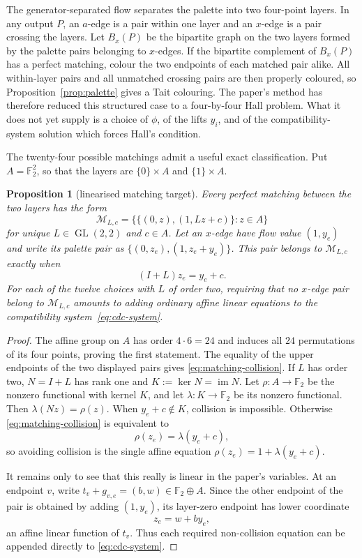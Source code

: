 \documentclass[11pt,a4paper]{article}
\newtheorem{proposition}[theorem]{Proposition}
\theoremstyle{definition}
\theoremstyle{remark}
\begin{document}
The generator-separated flow separates the palette into two four-point layers.  In any output $P$, an $a$-edge is a pair within one layer and an $x$-edge is a pair crossing the layers.  Let $B_x(P)$ be the bipartite graph on the two layers formed by the palette pairs belonging to $x$-edges.  If the bipartite complement of $B_x(P)$ has a perfect matching, colour the two endpoints of each matched pair alike.  All within-layer pairs and all unmatched crossing pairs are then properly coloured, so Proposition~\ref{prop:palette} gives a Tait colouring.  The paper's method has therefore reduced this structured case to a four-by-four Hall problem.  What it does not yet supply is a choice of $\phi$, of the lifts $y_i$, and of the compatibility-system solution which forces Hall's condition.

The twenty-four possible matchings admit a useful exact classification.  Put $A=\mathbb F_2^2$, so that the layers are $\{0\}\times A$ and $\{1\}\times A$.

\begin{proposition}[linearised matching target]\label{prop:linearised-matching}
Every perfect matching between the two layers has the form
\[
 \mathcal M_{L,c}=\bigl\{\{(0,z),(1,Lz+c)\}:z\in A\bigr\}
\]
for unique $L\in\operatorname{GL}(2,2)$ and $c\in A$.  Let an $x$-edge have flow value $(1,y_e)$ and write its palette pair as $\{(0,z_e),(1,z_e+y_e)\}$.  This pair belongs to $\mathcal M_{L,c}$ exactly when
\begin{equation}\label{eq:matching-collision}
 (I+L)z_e=y_e+c.
\end{equation}
For each of the twelve choices with $L$ of order two, requiring that no $x$-edge pair belong to $\mathcal M_{L,c}$ amounts to adding ordinary affine linear equations to the compatibility system~\eqref{eq:cdc-system}.
\end{proposition}
\begin{proof}
The affine group on $A$ has order $4\cdot6=24$ and induces all $24$ permutations of its four points, proving the first statement.  The equality of the upper endpoints of the two displayed pairs gives \eqref{eq:matching-collision}.  If $L$ has order two, $N=I+L$ has rank one and $K:=\ker N=\operatorname{im}N$.  Let $\rho\colon A\to\mathbb F_2$ be the nonzero functional with kernel $K$, and let $\lambda\colon K\to\mathbb F_2$ be its nonzero functional.  Then $\lambda(Nz)=\rho(z)$.  When $y_e+c\notin K$, collision is impossible.  Otherwise \eqref{eq:matching-collision} is equivalent to
\[
 \rho(z_e)=\lambda(y_e+c),
\]
so avoiding collision is the single affine equation $\rho(z_e)=1+\lambda(y_e+c)$.

It remains only to see that this really is linear in the paper's variables.  At an endpoint $v$, write $t_v+g_{v,e}=(b,w)\in\mathbb F_2\oplus A$.  Since the other endpoint of the pair is obtained by adding $(1,y_e)$, its layer-zero endpoint has lower coordinate
\[
 z_e=w+b y_e,
\]
an affine linear function of $t_v$.  Thus each required non-collision equation can be appended directly to \eqref{eq:cdc-system}.
\end{proof}
\end{document}
